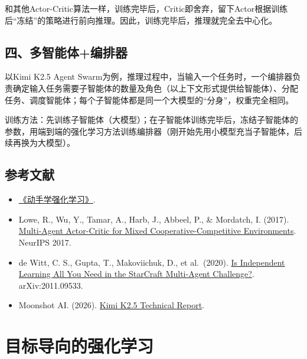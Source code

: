 和其他Actor-Critic算法一样，训练完毕后，Critic即舍弃，留下Actor根据训练后``冻结''的策略进行前向推理。因此，训练完毕后，推理就完全去中心化。

\hypertarget{ux56dbux591aux667aux80fdux4f53ux7f16ux6392ux5668}{%
\subsection{四、多智能体+编排器}\label{ux56dbux591aux667aux80fdux4f53ux7f16ux6392ux5668}}

以Kimi K2.5 Agent Swarm为例，推理过程中，当输入一个任务时，一个编排器负责确定输入任务需要子智能体的数量及角色（以上下文形式提供给智能体）、分配任务、调度智能体；每个子智能体都是同一个大模型的``分身''，权重完全相同。

训练方法：先训练子智能体（大模型）；在子智能体训练完毕后，冻结子智能体的参数，用端到端的强化学习方法训练编排器（刚开始先用小模型充当子智能体，后续再换为大模型）。

\hypertarget{ux53c2ux8003ux6587ux732e-63}{%
\subsection{参考文献}\label{ux53c2ux8003ux6587ux732e-63}}

\begin{itemize}
\tightlist
\item
  \href{https://hrl.boyuai.com/}{《动手学强化学习》}.
\item
  Lowe, R., Wu, Y., Tamar, A., Harb, J., Abbeel, P., \& Mordatch, I. (2017). \href{https://arxiv.org/abs/1706.02275}{Multi-Agent Actor-Critic for Mixed Cooperative-Competitive Environments}. NeurIPS 2017.
\item
  de Witt, C. S., Gupta, T., Makoviichuk, D., et al.~(2020). \href{https://arxiv.org/abs/2011.09533}{Is Independent Learning All You Need in the StarCraft Multi-Agent Challenge?}. arXiv:2011.09533.
\item
  Moonshot AI. (2026). \href{https://github.com/MoonshotAI/Kimi-K2.5/blob/master/tech_report.pdf}{Kimi K2.5 Technical Report}.
\end{itemize}

\clearpage

\hypertarget{ux76eeux6807ux5bfcux5411ux7684ux5f3aux5316ux5b66ux4e60}{%
\section{目标导向的强化学习}\label{ux76eeux6807ux5bfcux5411ux7684ux5f3aux5316ux5b66ux4e60}}

